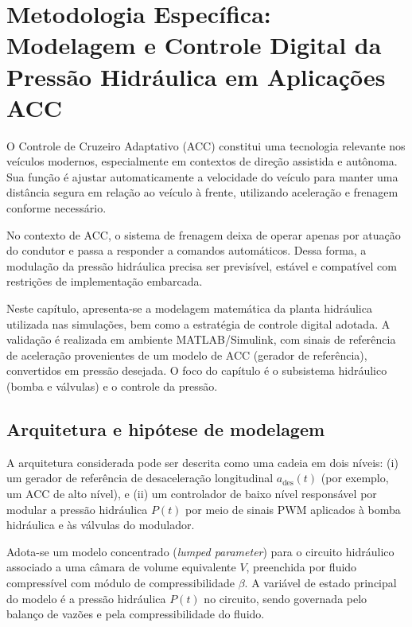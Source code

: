 \chapter{Metodologia Específica: Modelagem e Controle Digital da Pressão Hidráulica em Aplicações ACC}
\label{cap:controle}

O Controle de Cruzeiro Adaptativo (ACC) constitui uma tecnologia relevante nos veículos modernos, especialmente em contextos de direção assistida e autônoma. Sua função é ajustar automaticamente a velocidade do veículo para manter uma distância segura em relação ao veículo à frente, utilizando aceleração e frenagem conforme necessário.

No contexto de ACC, o sistema de frenagem deixa de operar apenas por atuação do condutor e passa a responder a comandos automáticos. Dessa forma, a modulação da pressão hidráulica precisa ser previsível, estável e compatível com restrições de implementação embarcada.

Neste capítulo, apresenta-se a modelagem matemática da planta hidráulica utilizada nas simulações, bem como a estratégia de controle digital adotada. A validação é realizada em ambiente MATLAB/Simulink, com sinais de referência de aceleração provenientes de um modelo de ACC (gerador de referência), convertidos em pressão desejada. O foco do capítulo é o subsistema hidráulico (bomba e válvulas) e o controle da pressão.

\section{Arquitetura e hipótese de modelagem}
\label{sec:controle-arquitetura}

A arquitetura considerada pode ser descrita como uma cadeia em dois níveis: (i) um gerador de referência de desaceleração longitudinal $a_{\text{des}}(t)$ (por exemplo, um ACC de alto nível), e (ii) um controlador de baixo nível responsável por modular a pressão hidráulica $P(t)$ por meio de sinais \gls{PWM} aplicados à bomba hidráulica e às válvulas do modulador.

Adota-se um modelo concentrado (\textit{lumped parameter}) para o circuito hidráulico associado a uma câmara de volume equivalente $V$, preenchida por fluido compressível com módulo de compressibilidade $\beta$. A variável de estado principal do modelo é a pressão hidráulica $P(t)$ no circuito, sendo governada pelo balanço de vazões e pela compressibilidade do fluido.

